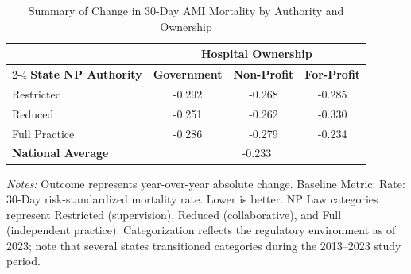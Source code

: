 \begin{table}[htbp]
    \centering
    \caption{Summary of Change in 30-Day AMI Mortality by Authority and Ownership}
    \label{tab:d_mortality_rate_ami}
    \vspace{0.2cm}
    \begin{tabular}{lccc}
        \toprule
        & \multicolumn{3}{c}{\textbf{Hospital Ownership}} \\
        \cmidrule(lr){2-4}
        \textbf{State NP Authority} & \textbf{Government} & \textbf{Non-Profit} & \textbf{For-Profit} \\
        \midrule
        Restricted & -0.292 & -0.268 & -0.285 \\
        Reduced & -0.251 & -0.262 & -0.330 \\
        Full Practice & -0.286 & -0.279 & -0.234 \\
        \midrule
        \textbf{National Average} & \multicolumn{3}{c}{-0.233} \\
        \bottomrule
    \end{tabular}
    \vspace{0.1cm}
    \begin{minipage}{0.85\textwidth}
        \footnotesize \textit{Notes:} Outcome represents year-over-year absolute change. Baseline Metric: Rate: 30-Day risk-standardized mortality rate. Lower is better. NP Law categories represent Restricted (supervision), Reduced (collaborative), and Full (independent practice). Categorization reflects the regulatory environment as of 2023; note that several states transitioned categories during the 2013--2023 study period.
    \end{minipage}
\end{table}